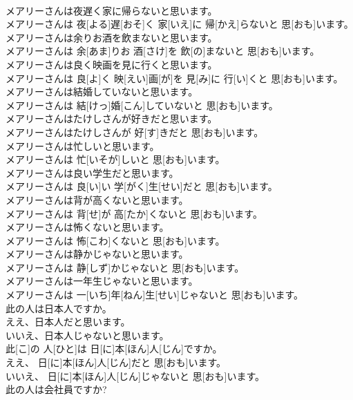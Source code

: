 \documentclass[8pt]{extreport}
\begin{document}
\begin{CJK}{UTF8}{min}
\\	メアリーさんは夜遅く家に帰らないと思います。	
\\	メアリーさんは 夜[よる]遅[おそ]く 家[いえ]に 帰[かえ]らないと 思[おも]います。
\\	メアリーさんは余りお酒を飲まないと思います。	
\\	メアリーさんは 余[あま]りお 酒[さけ]を 飲[の]まないと 思[おも]います。
\\	メアリーさんは良く映画を見に行くと思います。	
\\	メアリーさんは 良[よ]く 映[えい]画[が]を 見[み]に 行[い]くと 思[おも]います。
\\	メアリーさんは結婚していないと思います。	
\\	メアリーさんは 結[けっ]婚[こん]していないと 思[おも]います。
\\	メアリーさんはたけしさんが好きだと思います。	
\\	メアリーさんはたけしさんが 好[す]きだと 思[おも]います。
\\	メアリーさんは忙しいと思います。	
\\	メアリーさんは 忙[いそが]しいと 思[おも]います。
\\	メアリーさんは良い学生だと思います。	
\\	メアリーさんは 良[い]い 学[がく]生[せい]だと 思[おも]います。
\\	メアリーさんは背が高くないと思います。	
\\	メアリーさんは 背[せ]が 高[たか]くないと 思[おも]います。
\\	メアリーさんは怖くないと思います。	
\\	メアリーさんは 怖[こわ]くないと 思[おも]います。
\\	メアリーさんは静かじゃないと思います。	
\\	メアリーさんは 静[しず]かじゃないと 思[おも]います。
\\	メアリーさんは一年生じゃないと思います。	
\\	メアリーさんは 一[いち]年[ねん]生[せい]じゃないと 思[おも]います。
\\	此の人は日本人ですか。 
\\	ええ、日本人だと思います。 
\\	いいえ、日本人じゃないと思います。	
\\	此[こ]の 人[ひと]は 日[に]本[ほん]人[じん]ですか。 
\\	ええ、 日[に]本[ほん]人[じん]だと 思[おも]います。 
\\	いいえ、 日[に]本[ほん]人[じん]じゃないと 思[おも]います。
\\	此の人は会社員ですか? 

\end{CJK}
\end{document}
